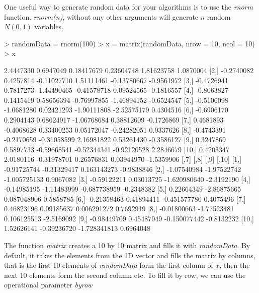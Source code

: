 \documentclass{article}
\begin{document}
One useful way to generate random data for your algorithms is to use
the \textit{rnorm} function.  \textit{rnorm(n)}, without any other arguments
will generate $n$ random $N(0,1)$ variables.  

\begin{Schunk}
\begin{Sinput}
> randomData = rnorm(100)
> x = matrix(randomData, nrow = 10, ncol = 10)
> x
\end{Sinput}
\begin{Soutput}
            [,1]       [,2]        [,3]        [,4]        [,5]       [,6]
 [1,]  2.4447330  0.6947049  0.18417679  0.23604748  1.81623758  1.0870004
 [2,] -0.2740082  0.4257814 -0.11027710  1.51111461 -0.13780667 -0.9561972
 [3,] -0.4726941  0.7817273 -1.44490465 -0.41578718  0.09524565 -0.1816557
 [4,] -0.8063827  0.1415419  0.58656394 -0.76997855 -1.46894152 -0.6524547
 [5,] -0.5106098 -1.0681280  0.02421293 -1.90111808 -2.52575179  0.4304516
 [6,] -0.6906170  0.2904143  0.68624917 -1.06768684  0.38812609 -0.1726869
 [7,]  0.4681893 -0.4068628  0.33400253  0.05172047 -0.24282051  0.9337626
 [8,] -0.4743391 -0.2170659 -0.31058599  2.16981822  0.53261430 -0.3586127
 [9,]  0.3247869  0.5897733 -0.59668541 -0.52344341 -0.92120528  2.2846679
[10,]  0.4203347  2.0180116 -0.31978701  0.26576831  0.03944970 -1.5359906
             [,7]        [,8]         [,9]      [,10]
 [1,] -0.91725744 -0.31329417  0.163143273 -0.9838846
 [2,] -1.07540984 -1.97522742 -1.005725133  0.9067082
 [3,] -0.59122211  0.03013725 -1.620980640 -2.3192190
 [4,] -0.14985195 -1.11483999 -0.687738959 -0.2348382
 [5,]  0.22664349 -2.86875665  0.087048906  0.5858785
 [6,] -0.21358463  0.41894411 -0.451577780  0.4075496
 [7,]  0.46823196  0.09185637  0.006291272  0.7692919
 [8,] -0.01800663 -1.77523481  0.106125513 -2.5169092
 [9,] -0.98449709  0.45487949 -0.150077442 -0.8132232
[10,]  1.52626141 -0.39236720 -1.728341813  0.6964048
\end{Soutput}
\end{Schunk}

The function \textit{matrix} creates a 10 by 10 matrix and fills it with
\textit{randomData}.  By default, it takes the elements from the 1D vector
and fills the matrix by columns, that is the first 10 elements of
\textit{randomData} form the first column of $x$, then the next 10 elements
form the second column etc.  To fill it by row, we can use the operational
parameter \textit{byrow}
\end{document}

